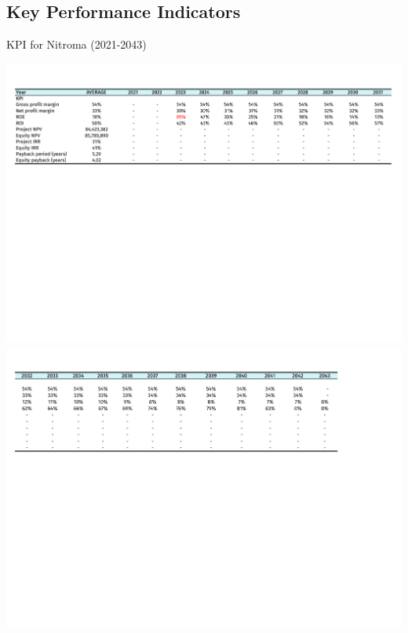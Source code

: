 
\begin{landscape}
\subsection{Key Performance Indicators}
\begin{table}[H]
\label{tab:KPI}
  \caption{KPI for Nitroma (2021-2043)}
\includegraphics[clip, trim=0cm 10cm 0cm 1cm, width=\linewidth]{chapters/Z-support/attachments/KPI1.pdf} \\

\includegraphics[clip, trim=0cm 12cm 0cm 1cm, width=\linewidth]{chapters/Z-support/attachments/KPI2.pdf}
\end{table}
\end{landscape}

